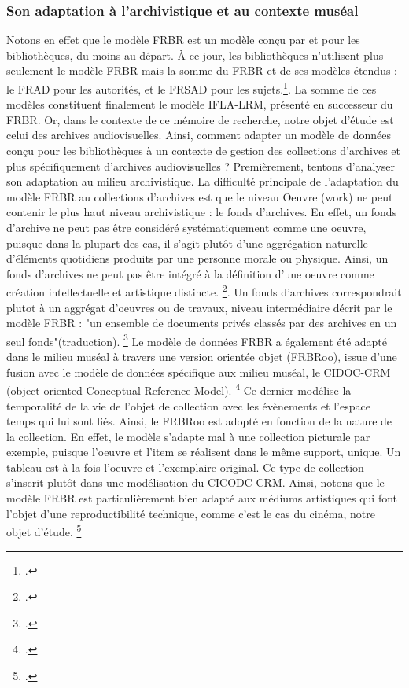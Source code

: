 \subsubsection{Son adaptation à l'archivistique et au contexte muséal}

Notons en effet que le modèle FRBR est un modèle conçu par et pour les bibliothèques, du moins au départ. À ce jour, les bibliothèques n'utilisent plus seulement le modèle FRBR mais la somme du FRBR et de ses modèles étendus : le FRAD pour les autorités, et le FRSAD pour les sujets.\footcite{zotero-item-651}. La somme de ces modèles constituent finalement le modèle IFLA-LRM, présenté en successeur du FRBR. Or, dans le contexte de ce mémoire de recherche, notre objet d'étude est celui des archives audiovisuelles. Ainsi, comment adapter un modèle de données conçu pour les bibliothèques à un contexte de gestion des collections d'archives et plus spécifiquement d'archives audiovisuelles ?
Premièrement, tentons d'analyser son adaptation au milieu archivistique. La difficulté principale de l'adaptation du modèle FRBR au collections d'archives est que le niveau Oeuvre (work) ne peut contenir le plus haut niveau archivistique : le fonds d'archives. En effet, un fonds d'archive ne peut pas être considéré systématiquement comme une oeuvre, puisque dans la plupart des cas, il s'agit plutôt d'une aggrégation naturelle d'éléments quotidiens produits par une personne morale ou physique. Ainsi, un fonds d'archives ne peut pas être intégré à la définition d'une oeuvre comme création intellectuelle et artistique distincte. \footcite{fick2015}. Un fonds d'archives correspondrait plutot à un aggrégat d'oeuvres ou de travaux, niveau intermédiaire décrit par le modèle FRBR : "un ensemble de documents privés classés par des archives en un seul fonds"(traduction). \footcite{fick2015}
Le modèle de données FRBR a également été adapté dans le milieu muséal à travers une version orientée objet (FRBRoo), issue d'une fusion avec le modèle de données spécifique aux milieu muséal, le CIDOC-CRM (object-oriented Conceptual Reference Model). \footcite{gillis2015} Ce dernier modélise la temporalité de la vie de l'objet de collection avec les évènements et l'espace temps qui lui sont liés. Ainsi, le FRBRoo est adopté en fonction de la nature de la collection. En effet, le modèle s'adapte mal à une collection picturale par exemple, puisque l'oeuvre et l'item se réalisent dans le même support, unique. Un tableau est à la fois l'oeuvre et l'exemplaire original. Ce type de collection s'inscrit plutôt dans une modélisation du CICODC-CRM.
Ainsi, notons que le modèle FRBR est particulièrement bien adapté aux médiums artistiques qui font l'objet d'une reproductibilité technique, comme c'est le cas du cinéma, notre objet d'étude. \footcite{zotero-item-669} 

